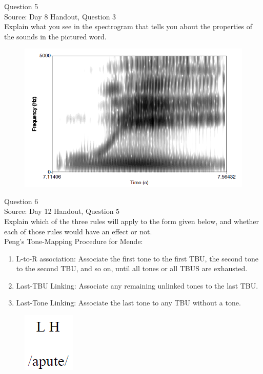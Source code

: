\documentclass[12pt]{article}
\begin{document}
\newpage

{\large Question 5}\\

Source: Day 8 Handout, Question 3\\

Explain what you see in the spectrogram that tells you about the properties of the sounds in the pictured word.\\

\begin{figure}[H]
\includegraphics{../images/spectrogram_we.png}
\end{figure}

\newpage

{\large Question 6}\\

Source: Day 12 Handout, Question 5\\

Explain which of the three rules will apply to the form given below, and whether each of those rules would have an effect or not.\\

Peng’s Tone-Mapping Procedure for Mende: \begin{enumerate} \item L-to-R association: Associate the first tone to the first TBU, the second tone to the second TBU, and so on, until all tones or all TBUS are exhausted. \item Last-TBU Linking: Associate any remaining unlinked tones to the last TBU. \item Last-Tone Linking: Associate the last tone to any TBU without a tone. \end{enumerate}

\begin{figure}[H]
\includegraphics{../images/mendetone_c.png}
\end{figure}
\end{document}
